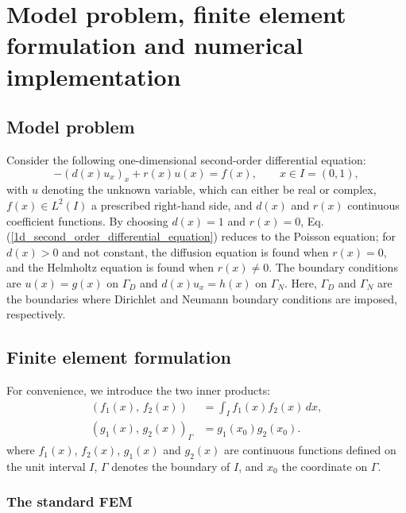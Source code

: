 \documentclass[review,3p]{elsarticle}
\begin{document}
\section{Model problem, finite element formulation and numerical implementation}	\label{section_model_problem_FEM_formulation_numerical_implementation}

\subsection{Model problem}

Consider the following one-dimensional second-order differential equation:
\begin{equation}
  -\left(d(x) u_x \right)_x + r(x)u(x) = f(x),\qquad x \in I = (0,1),	\label{1d_second_order_differential_equation}
\end{equation}
with $u$ denoting the unknown variable, which can either be real or complex, $f(x) \in L^2 (I)$ a prescribed right-hand side, and $d(x)$ and $r(x)$ continuous coefficient functions.
By choosing $d(x)=1$ and $r(x)=0$, Eq. (\ref{1d_second_order_differential_equation}) reduces to the Poisson equation; for $d(x)>0$ and not constant, the diffusion equation is found when $r(x)=0$, and the Helmholtz equation is found when $r(x) \neq 0$. 
The boundary conditions are $u(x)=g(x)$ on $\Gamma_D$ and $d(x)u_x=h(x)$ on $\Gamma_N$. Here, $\Gamma_D$ and $\Gamma_N$ are the boundaries where Dirichlet and Neumann boundary conditions are imposed, respectively.

\subsection{Finite element formulation} 	\label{FE formulation}

For convenience, we introduce the two inner products:
 \begin{subequations}
  \begin{align}
   (f_1(x), \,f_2(x) ) &= \int _I f_1(x) f_2(x) \, dx,	\\
   (g_1(x), \,g_2(x) )_{\Gamma} &= g_1(x_0) g_2(x_0).
  \end{align}
 \end{subequations}
where $f_1(x)$, $f_2(x)$, $g_1(x)$ and $g_2(x)$ are continuous functions defined on the unit interval $I$, $\Gamma$ denotes the boundary of $I$, and $x_0$ the coordinate on $\Gamma$.

\subsubsection{The standard FEM}
\end{document}
